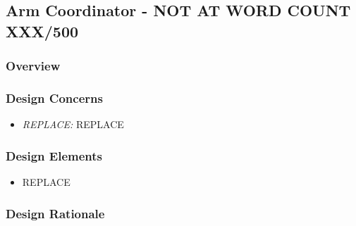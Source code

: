 \subsection{Arm Coordinator - NOT AT WORD COUNT XXX/500}
\subsubsection{Overview}

\subsubsection{Design Concerns}
\begin{itemize}
\item \textit{REPLACE:} REPLACE

\end{itemize}

\subsubsection{Design Elements}
\begin{itemize}
\item REPLACE
\end{itemize}

\subsubsection{Design Rationale}
